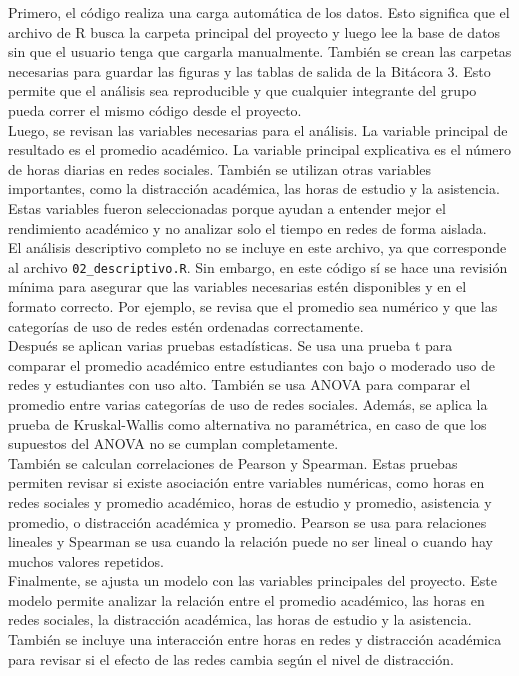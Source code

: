 \documentclass[12pt]{article}
\begin{document}
Primero, el código realiza una carga automática de los datos. Esto significa que el archivo de R busca la carpeta principal del proyecto y luego lee la base de datos sin que el usuario tenga que cargarla manualmente. También se crean las carpetas necesarias para guardar las figuras y las tablas de salida de la Bitácora 3. Esto permite que el análisis sea reproducible y que cualquier integrante del grupo pueda correr el mismo código desde el proyecto.
\\

Luego, se revisan las variables necesarias para el análisis. La variable principal de resultado es el promedio académico. La variable principal explicativa es el número de horas diarias en redes sociales. También se utilizan otras variables importantes, como la distracción académica, las horas de estudio y la asistencia. Estas variables fueron seleccionadas porque ayudan a entender mejor el rendimiento académico y no analizar solo el tiempo en redes de forma aislada.
\\

El análisis descriptivo completo no se incluye en este archivo, ya que corresponde al archivo \texttt{02\_descriptivo.R}. Sin embargo, en este código sí se hace una revisión mínima para asegurar que las variables necesarias estén disponibles y en el formato correcto. Por ejemplo, se revisa que el promedio sea numérico y que las categorías de uso de redes estén ordenadas correctamente.
\\

Después se aplican varias pruebas estadísticas. Se usa una prueba t para comparar el promedio académico entre estudiantes con bajo o moderado uso de redes y estudiantes con uso alto. También se usa ANOVA para comparar el promedio entre varias categorías de uso de redes sociales. Además, se aplica la prueba de Kruskal-Wallis como alternativa no paramétrica, en caso de que los supuestos del ANOVA no se cumplan completamente.
\\

También se calculan correlaciones de Pearson y Spearman. Estas pruebas permiten revisar si existe asociación entre variables numéricas, como horas en redes sociales y promedio académico, horas de estudio y promedio, asistencia y promedio, o distracción académica y promedio. Pearson se usa para relaciones lineales y Spearman se usa cuando la relación puede no ser lineal o cuando hay muchos valores repetidos.
\\

Finalmente, se ajusta un modelo con las variables principales del proyecto. Este modelo permite analizar la relación entre el promedio académico, las horas en redes sociales, la distracción académica, las horas de estudio y la asistencia. También se incluye una interacción entre horas en redes y distracción académica para revisar si el efecto de las redes cambia según el nivel de distracción.
\\
\end{document}
